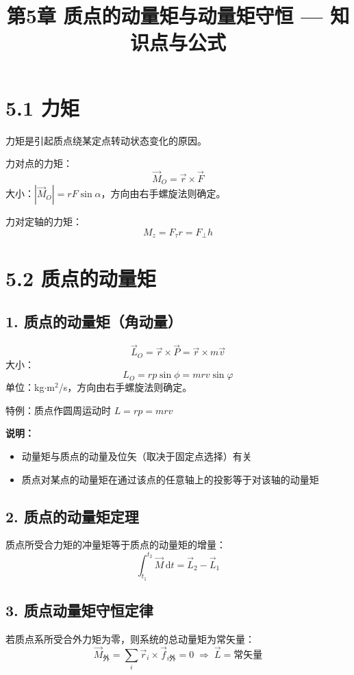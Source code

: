 \documentclass{ctexart}
\title{\textbf{第5章 质点的动量矩与动量矩守恒} --- 知识点与公式}
\author{}
\date{}
\begin{document}
\maketitle

\section*{5.1 力矩}

力矩是引起质点绕某定点转动状态变化的原因。

力对点的力矩：
\[
\vec{M}_O = \vec{r} \times \vec{F}
\]
大小：$|\vec{M}_O| = rF\sin\alpha$，方向由右手螺旋法则确定。

力对定轴的力矩：
\[
M_z = F_\tau r = F_\perp h
\]

\section*{5.2 质点的动量矩}

\subsection*{1. 质点的动量矩（角动量）}
\[
\vec{L}_O = \vec{r} \times \vec{P} = \vec{r} \times m\vec{v}
\]
大小：
\[
L_O = rp\sin\phi = mrv\sin\varphi
\]
单位：kg$\cdot$m$^2$/s，方向由右手螺旋法则确定。

特例：质点作圆周运动时 $L = rp = mrv$

\textbf{说明：}
\begin{itemize}
  \item 动量矩与质点的动量及位矢（取决于固定点选择）有关
  \item 质点对某点的动量矩在通过该点的任意轴上的投影等于对该轴的动量矩
\end{itemize}

\subsection*{2. 质点的动量矩定理}
质点所受合力矩的冲量矩等于质点的动量矩的增量：
\[
\int_{t_1}^{t_2} \vec{M}\,\mathrm{d}t = \vec{L}_2 - \vec{L}_1
\]

\subsection*{3. 质点动量矩守恒定律}
若质点系所受合外力矩为零，则系统的总动量矩为常矢量：
\[
\vec{M}_{\text{外}} = \sum_i \vec{r}_i \times \vec{f}_{i\text{外}} = 0 \;\Longrightarrow\; \vec{L} = \text{常矢量}
\]
\end{document}
